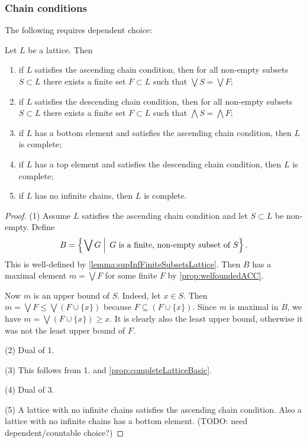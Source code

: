 \subsubsection{Chain conditions}
The following requires dependent choice:
\begin{proposition} \label{prop:ascendingDescendingChainLattice}
Let $L$ be a lattice. Then
\begin{enumerate}
\item if $L$ satisfies the ascending chain condition, then for all non-empty subsets $S\subset L$ there exists a finite set $F\subset L$ such that $\bigvee S = \bigvee F$;
\item if $L$ satisfies the descending chain condition, then for all non-empty subsets $S\subset L$ there exists a finite set $F\subset L$ such that $\bigwedge S = \bigwedge F$;
\item if $L$ has a bottom element and satisfies the ascending chain condition, then $L$ is complete;
\item if $L$ has a top element and satisfies the descending chain condition, then $L$ is complete;
\item if $L$ has no infinite chains, then $L$ is complete.
\end{enumerate}
\end{proposition}
\begin{proof}
(1) Assume $L$ satisfies the ascending chain condition and let $S\subset L$ be non-empty. Define
\[ B = \left\{\left. \bigvee G \;\right|\; \text{$G$ is a finite, non-empty subset of $S$} \right\}. \]
This is well-defined by \ref{lemma:supInfFiniteSubsetsLattice}. Then $B$ has a maximal element $m = \bigvee F$ for some finite $F$ by \ref{prop:welfoundedACC}.

Now $m$ is an upper bound of $S$. Indeed, let $x\in S$. Then $m= \bigvee F \leq \bigvee (F\cup\{x\})$ because $F\subseteq (F\cup \{x\})$. Since $m$ is maximal in $B$, we have $m = \bigvee (F\cup\{x\}) \geq x$. It is clearly also the least upper bound, otherwise it was not the least upper bound of $F$.

(2) Dual of 1.

(3) This follows from 1. and \ref{prop:completeLatticeBasic}.

(4) Dual of 3.

(5) A lattice with no infinite chains satisfies the ascending chain condition. Also a lattice
with no infinite chains has a bottom element. (TODO: need dependent/countable choice?)
\end{proof}


